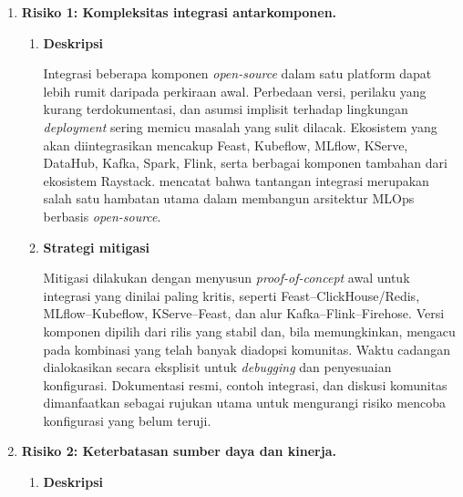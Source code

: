 \vspace{0.5em}

\begin{enumerate}
    \item \textbf{Risiko 1: Kompleksitas integrasi antarkomponen.}
    
    \vspace{0.5em}
    \begin{enumerate}[label=\alph*)]
        \item \textbf{Deskripsi}
        
        Integrasi beberapa komponen \textit{open-source} dalam satu platform dapat lebih rumit daripada perkiraan awal. Perbedaan versi, perilaku yang kurang terdokumentasi, dan asumsi implisit terhadap lingkungan \textit{deployment} sering memicu masalah yang sulit dilacak. Ekosistem yang akan diintegrasikan mencakup Feast, Kubeflow, MLflow, KServe, DataHub, Kafka, Spark, Flink, serta berbagai komponen tambahan dari ekosistem Raystack. \textcite{burgueno2025toward} mencatat bahwa tantangan integrasi merupakan salah satu hambatan utama dalam membangun arsitektur MLOps berbasis \textit{open-source}.
        
        \vspace{0.5em}
        
        \item \textbf{Strategi mitigasi}
        
        Mitigasi dilakukan dengan menyusun \textit{proof-of-concept} awal untuk integrasi yang dinilai paling kritis, seperti Feast--ClickHouse/Redis, MLflow--Kubeflow, KServe--Feast, dan alur Kafka--Flink--Firehose. Versi komponen dipilih dari rilis yang stabil dan, bila memungkinkan, mengacu pada kombinasi yang telah banyak diadopsi komunitas. Waktu cadangan dialokasikan secara eksplisit untuk \textit{debugging} dan penyesuaian konfigurasi. Dokumentasi resmi, contoh integrasi, dan diskusi komunitas dimanfaatkan sebagai rujukan utama untuk mengurangi risiko mencoba konfigurasi yang belum teruji.
        
        \vspace{0.5em}
    \end{enumerate}
    
    \item \textbf{Risiko 2: Keterbatasan sumber daya dan kinerja.}
    
    \vspace{0.5em}
    \begin{enumerate}[label=\alph*)]
        \item \textbf{Deskripsi}
        

\end{enumerate}
\end{enumerate}
